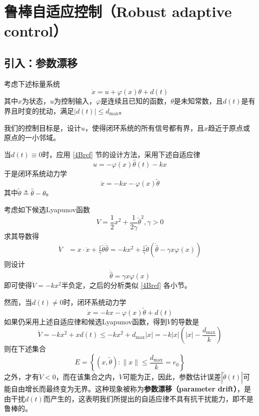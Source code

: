 \section{鲁棒自适应控制（Robust adaptive control）}\label{4Eref}
\subsection{引入：参数漂移}
考虑下述标量系统
\begin{equation}
    \dot{x} = u + \varphi(x)\theta + d(t)\label{Sys:with_disturbance}
\end{equation}
其中$x$为状态，$u$为控制输入，$\varphi$是连续且已知的函数，$\theta$是未知常数，且$d(t)$是有界且时变的扰动，满足$|d(t)|\le d_{\max}$。

我们的控制目标是，设计$u$，使得闭环系统的所有信号都有界，且$x$趋近于原点或原点的一小邻域。

当$d(t)\equiv 0$时，应用 \ref{4Bref} 节的设计方法，采用下述自适应律
\[ u=-\varphi(x)\hat{\theta}(t)-kx\]
于是闭环系统动力学
\[\dot{x}=-kx-\varphi(x)\tilde{\theta}\]
其中$\tilde{\theta} \triangleq \hat{\theta}-\theta$。

考虑如下候选Lyapunov函数
\[V=\frac12 x^2+\frac{1}{2\gamma}\tilde{\theta}^2,\gamma>0\]
求其导数得
\begin{align*}
    \dot{V}&=x\cdot\dot{x}+\frac{1}{\gamma}\tilde{\theta}\dot{\hat{\theta}}
    =-kx^2+\frac{1}{\gamma}\tilde{\theta}(\dot{\hat{\theta}}-\gamma x\varphi(x))
\end{align*}
则设计
\begin{equation}
    \dot{\hat{\theta}}=\gamma x\varphi(x)\label{adaptive_nodisturbance}
\end{equation}
即可使得$\dot{V}=-kx^2$半负定，之后的分析类似 \ref{4Bref} 各小节。

然而，当$d(t)\ne 0$时，闭环系统动力学
\[\dot{x}=-kx-\varphi(x)\tilde{\theta}+d(t)\]
如果仍采用上述自适应律和候选Lyapunov函数，得到$V$的导数是
\[\dot{V}=-kx^2+x d(t)\le -kx^2+d_{\max}|x|=-k|x|(|x|-\frac{d_{\max}}{k})\]
则在下述集合
\[E = \left\{(x,\tilde{\theta}): \| x \| \leq \frac{d_{\max}}{k} = e_{0}\right\}\]
之外，才有$\dot{V}<0$，而在该集合之内，$\dot{V}$可能为正，因此，参数估计误差$|\tilde{\theta}(t)|$可能自由增长而最终变为无界。这种现象被称为{\bf 参数漂移（parameter drift）}，是由干扰$d(t)$而产生的，这表明我们所提出的自适应律不具有抗干扰能力，即不是鲁棒的。

